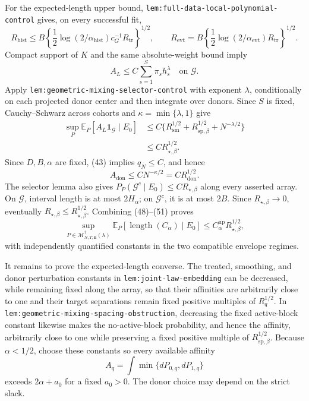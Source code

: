For the expected-length upper bound, \texttt{lem:full-data-local-polynomial-control} gives, on every successful fit,
\[
R_{\mathrm{hist}}
\leq B\left\{\frac12\log(2/\alpha_{\mathrm{hist}})c_G^{-1}R_{\mathrm{tr}}\right\}^{1/2},
\qquad
R_{\mathrm{evt}}
=B\left\{\frac12\log(2/\alpha_{\mathrm{evt}})R_{\mathrm{tr}}\right\}^{1/2}.
\tag{48}
\]
Compact support of \(K\) and the same absolute-weight bound imply
\[
A_L\leq C\sum_{s=1}^{S}\pi_sh_s^\lambda
\quad\text{on }\mathcal G.
\tag{49}
\]
Apply \texttt{lem:geometric-mixing-selector-control} with exponent \(\lambda\), conditionally on each projected donor center and then integrate over donors.  Since \(S\) is fixed, Cauchy--Schwarz across cohorts and \(\kappa=\min\{\lambda,1\}\) give
\[
\begin{aligned}
\sup_P\mathbb E_P[A_L\mathbf1_{\mathcal G}\mid E_0]
&\leq C\{R_{\mathrm{sm}}^{1/2}
+R_{\mathrm{sp},\beta}^{1/2}+N^{-\lambda/2}\}\\
&\leq CR_{\star,\beta}^{1/2}.
\end{aligned}
\tag{50}
\]
Since \(D,B,\alpha\) are fixed, (43) implies \(q_N\leq C\), and hence
\[
A_{\mathrm{don}}\leq CN^{-\kappa/2}=CR_{\mathrm{don}}^{1/2}.
\tag{51}
\]
The selector lemma also gives
\(P_P(\mathcal G^c\mid E_0)\leq CR_{\star,\beta}\) along every asserted array.  On \(\mathcal G\), interval length is at most \(2H_\alpha\); on \(\mathcal G^c\), it is at most \(2B\).  Since \(R_{\star,\beta}\to0\), eventually \(R_{\star,\beta}\leq R_{\star,\beta}^{1/2}\).  Combining (48)--(51) proves
\[
\sup_{P\in\mathcal M_{N,T,\mathbf n}^{\dagger}(\lambda)}
\mathbb E_P[\operatorname{length}(C_\alpha)\mid E_0]
\leq C_\alpha^{\mathrm{up}}R_{\star,\beta}^{1/2},
\tag{52}
\]
with independently quantified constants in the two compatible envelope regimes.

It remains to prove the expected-length converse.  The treated, smoothing, and donor perturbation constants in \texttt{lem:joint-law-embedding} can be decreased, while remaining fixed along the array, so that their affinities are arbitrarily close to one and their target separations remain fixed positive multiples of \(R_q^{1/2}\).  In \texttt{lem:geometric-mixing-spacing-obstruction}, decreasing the fixed active-block constant likewise makes the no-active-block probability, and hence the affinity, arbitrarily close to one while preserving a fixed positive multiple of \(R_{\mathrm{sp},\beta}^{1/2}\).  Because \(\alpha<1/2\), choose these constants so every available affinity
\[
A_q=\int\min\{dP_{0,q},dP_{1,q}\}
\]
exceeds \(2\alpha+a_0\) for a fixed \(a_0>0\).  The donor choice may depend on the strict slack.

